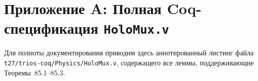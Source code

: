 %
%
%
%
%


\section*{Приложение A: Полная Coq-спецификация \texttt{HoloMux.v}}
\label{sec:appendix-coq-holmux}

Для полноты документирования приводим здесь аннотированный листинг
файла \texttt{t27/trios-coq/Physics/HoloMux.v}, содержащего все
леммы, поддерживающие Теоремы~85.1--85.3.


